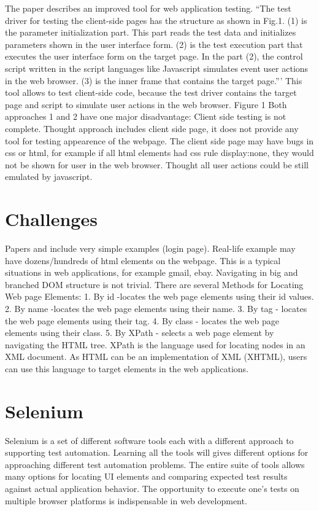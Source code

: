 		The paper \cite{testGen3} describes an improved tool for web application testing. 
			``The test driver for testing the client-side pages has the structure as
			shown in Fig.1. (1)  is the parameter initialization part. This part reads the test data and 
		 initializes parameters shown in the  user interface form. (2) is the test 
		 execution part that executes the  user interface form on the target 
		 page. In the part (2), the control  script written in the script 
		 languages like Javascript simulates event user actions in the web browser. (3) is the inner frame 
		 that contains the target page.'''
		  This tool allows to test client-side code, because the test driver
		  contains the target page and script to simulate user actions in the
		  web browser. 
		  				Figure 1
		Both approaches 1 and 2 have one major disadvantage:
			Client side testing is not complete. Thought approach includes client side
			page, it does not provide any tool for testing appearence of the webpage. The
			client side page may have bugs in css or html, for example if all html
			elements had css rule display:none, they would not be shown for user in the
			web browser. Thought all user actions could be still emulated by javascript.
	\section {Challenges}
		Papers \cite{Xu1} \cite{Zhongen2} and \cite{testGen3} include very simple examples
		(login page). Real-life example may have dozens/hundreds of html elements on the webpage. This is a typical
		situations in web applications, for example gmail, ebay. Navigating in big and
		branched DOM structure is not trivial. 
		There are several Methods for Locating Web page Elements:
			1. By id -locates the web page elements using their id values.
			2. By name -locates the web page elements using their name.
			3. By tag - locates the web page elements using their tag.
			4. By class - locates the web page elements using their class. 
			5. By XPath - selects a web page element by navigating the HTML tree.
		XPath is the language used for locating nodes in an XML document. As HTML can
		be an implementation of XML (XHTML), users can use this language to target
		elements in the web applications.	

	\section {Selenium}
      Selenium is a set of different software tools each with a different approach
       to supporting test automation. Learning all the tools will gives different options for approaching different 
       test automation problems. The entire suite of tools allows many options for locating UI
       elements and comparing expected test results against actual application behavior.
       The opportunity to execute one’s tests on multiple browser platforms is indispensable
       in web development. 
       
